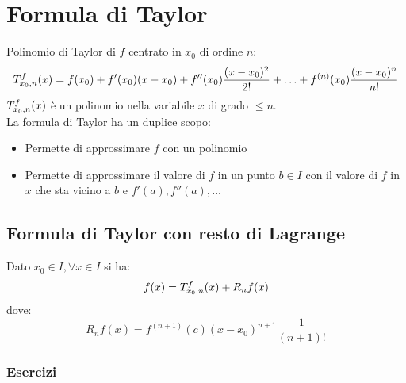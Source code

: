 \documentclass[12pt, a4paper]{report}
\begin{document}
\newpage
\tableofcontents
\chapter{Formula di Taylor}
    Polinomio di Taylor di $f$ centrato in $x_{0}$ di ordine $n$:
    \begin{equation*}
        \taylor{f}{x_{0}}{n}(x) = f(x_{0})+f'(x_{0})(x-x_{0})+f''(x_{0})\frac{(x-x_{0})^{2}}{2!}+\ldots+f^{(n)}(x_{0})\frac{(x-x_{0})^{n}}{n!} 
    \end{equation*}
    $\taylor{f}{x_{0}}{n}(x)$ è un polinomio nella variabile $x$ di grado $\leq n$.\\
    La formula di Taylor ha un duplice scopo:
    \begin{itemize}
        \item Permette di approssimare $f$ con un polinomio
        \item Permette di approssimare il valore di $f$ in un punto $b\in I$ con il valore di $f$ in $x$ che sta vicino a $b$ e $f'(a),f''(a),\ldots$
    \end{itemize}
    \section{Formula di Taylor con resto di Lagrange}
        Dato $x_{0}\in I,\forall x\in I$ si ha:
        \begin{equation*}
            f(x) = \taylor{f}{x_{0}}{n}(x) + R_{n}f(x)
        \end{equation*}
        dove:
        \begin{equation*}
            R_{n}f(x) = f^{(n+1)}(c)(x-x_{0})^{n+1}\frac{1}{(n+1)!}
        \end{equation*}
        \subsection{Esercizi}
\end{document}
